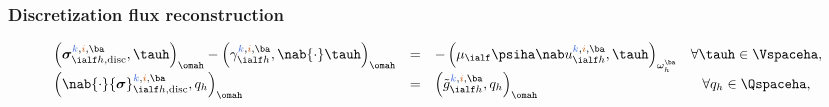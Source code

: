 \documentclass[aspectratio=169]{beamer}
\newcommand{\kk}{\textcolor{royalblue}{k}}
\newcommand{\ii}{\textcolor{burntorange}{i}}
\begin{document}
%
\begin{frame}
\frametitle{Discretization flux reconstruction}
\vspace{-0.4 cm}
\begin{equation*}
\begin{array}{lclcc}
\left({\bm \sigma}_{\ialf h, \mathrm{disc}}^{\kk,\ii,\ba}, \tauh\right)_{\omah}- \left(\gamma_{\ialf h}^{\kk,\ii,\ba},\nab {\cdot} \tauh\right)_{\omah}
&=& -\left(\mu_\ialf \psiha \nab u_{\ialf h}^{\kk,\ii,\ba}, \tauh \right)_{\omega_h^{\ba}}
&  \forall \tauh\in \Vspaceha, \\
\left(\nab {\cdot} {\bm \sigma}_{\ialf h, \mathrm{disc}}^{\kk,\ii, \ba}, q_{h}\right)_{\omah}
&=&\left(\tilde{g}_{\ialf h}^{\kk,\ii,\ba}, q_{h}\right)_{\omah}
&  \forall q_{h}\in \Qspaceha,
\end{array}
\end{equation*}


\end{frame}
\end{document}
